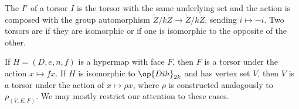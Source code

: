 \begin{definition}
 The  $I'$ of a torsor $I$ is the torsor with the
same underlying set and the action is composed with the group automorphism
$\ring{Z}/k\ring{Z}\to\ring{Z}/k\ring{Z}$, sending $i\mapsto -i$.
Two torsors are  if they are isomorphic or if 
one is isomorphic to the opposite of the other.
\end{definition}


\begin{example} If $H=(D,e,n,f)$ is a hypermap with face $F$,
then $F$ is a torsor under the action $x \mapsto f x$.  If $H$ is
isomorphic to $\op{Dih}_{2k}$ and has vertex set $V$, then $V$ is a torsor
under the action of $x\mapsto \rho x$, where $\rho$ is constructed
analogously to $\rho_{(V,E,F)}$.  We may mostly restrict our attention to
these cases.
\end{example}




